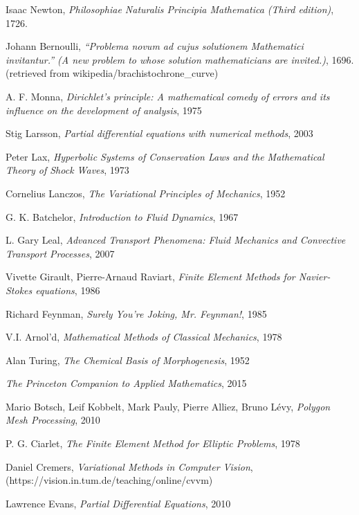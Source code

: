 \documentclass[11pt,a4paper]{memoir}
\begin{document}
\begin{thebibliography}{9}

Isaac Newton, \textit{Philosophiae Naturalis Principia Mathematica (Third edition)}, 1726.

Johann Bernoulli, \textit{``Problema novum ad cujus solutionem Mathematici invitantur.'' (A new problem to whose solution mathematicians are invited.)}, 1696.
(retrieved from wikipedia/brachistochrone\_curve)

A. F. Monna, \textit{Dirichlet's principle: A mathematical comedy of errors and its influence on the development of analysis}, 1975

Stig Larsson, \textit{Partial differential equations with numerical methods}, 2003

Peter Lax, \textit{Hyperbolic Systems of Conservation Laws and the Mathematical Theory of Shock Waves}, 1973

Cornelius Lanczos, \textit{The Variational Principles of Mechanics}, 1952

G. K. Batchelor, \textit{Introduction to Fluid Dynamics}, 1967

L. Gary Leal, \textit{Advanced Transport Phenomena: Fluid Mechanics and Convective Transport Processes}, 2007

Vivette Girault, Pierre-Arnaud Raviart, \textit{Finite Element Methods for Navier-Stokes equations}, 1986

Richard Feynman, \textit{Surely You're Joking, Mr. Feynman!}, 1985

V.I. Arnol'd, \textit{Mathematical Methods of Classical Mechanics}, 1978

Alan Turing, \textit{The Chemical Basis of Morphogenesis}, 1952

\textit{The Princeton Companion to Applied Mathematics}, 2015

Mario Botsch, Leif Kobbelt, Mark Pauly, Pierre Alliez, Bruno L\'evy, \textit{Polygon Mesh Processing}, 2010

P. G. Ciarlet, \textit{The Finite Element Method for Elliptic Problems}, 1978

Daniel Cremers, \textit{Variational Methods in Computer Vision},\\(https://vision.in.tum.de/teaching/online/cvvm)

Lawrence Evans, \textit{Partial Differential Equations}, 2010


\end{thebibliography}
\end{document}
